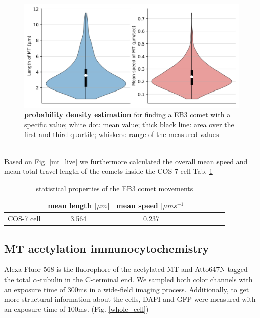 \begin{figure}[h!]
	\begin{center}
		\begin{minipage}{0,8\textwidth}
			
			\includegraphics[width=\textwidth]{analysis/reports/prob_density.png}
			\caption{\textbf{probability density estimation} for finding a EB3 comet with a specific value; white dot: mean value; thick black line: area over the first and third quartile; whiskers: range of the measured values} 
			\label{prob_density} 
		\end{minipage}
	\end{center}
\end{figure}
\\
Based on Fig. \ref{mt_live} we furthermore calculated the overall mean speed and mean total travel length of the comets inside the COS-7 cell Tab. \ref{tab:comet}

\begin{table}[h] 
    \footnotesize
    \begin{center}
        \caption{statistical properties of the EB3 comet movements}
        \begin{tabular} {c c c l l l l l}
            & mean length [$\mu m$]&  mean speed [$\mu m s^{-1}$] \\ \hline
            COS-7 cell & 3.564 & 0.237  \\ \hline 
        \end{tabular}
        \label{tab:comet}
    \end{center}
\end{table}



\subsection{MT acetylation immunocytochemistry}
Alexa Fluor 568 is the fluorophore of the acetylated MT and Atto647N tagged the total $\alpha$-tubulin in the C-terminal end. We sampled both color channels with an exposure time of 300ms in a wide-field imaging process. Additionally, to get more structural information about the cells, DAPI and GFP were measured with an exposure time of 100ms. (Fig. \ref{whole_cell})

